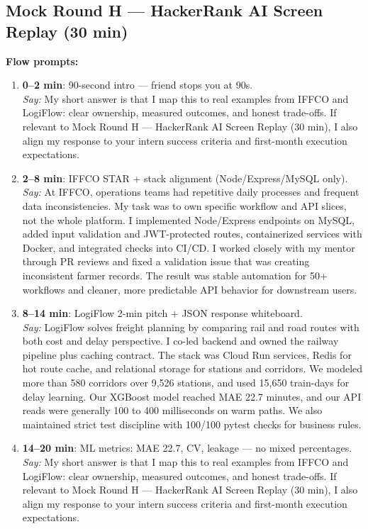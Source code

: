 \documentclass[9pt,a4paper]{article}
\begin{document}
\subsection{Mock Round H --- HackerRank AI Screen Replay (30 min)}
\textbf{Flow prompts:}
\begin{enumerate}
  \item \textbf{0--2 min}: 90-second intro --- friend stops you at 90s.\\
  \textit{Say:} My short answer is that I map this to real examples from IFFCO and LogiFlow: clear ownership, measured outcomes, and honest trade-offs. If relevant to Mock Round H --- HackerRank AI Screen Replay (30 min), I also align my response to your intern success criteria and first-month execution expectations.
  \item \textbf{2--8 min}: IFFCO STAR + stack alignment (Node/Express/MySQL only).\\
  \textit{Say:} At IFFCO, operations teams had repetitive daily processes and frequent data inconsistencies. My task was to own specific workflow and API slices, not the whole platform. I implemented Node/Express endpoints on MySQL, added input validation and JWT-protected routes, containerized services with Docker, and integrated checks into CI/CD. I worked closely with my mentor through PR reviews and fixed a validation issue that was creating inconsistent farmer records. The result was stable automation for 50+ workflows and cleaner, more predictable API behavior for downstream users.
  \item \textbf{8--14 min}: LogiFlow 2-min pitch + JSON response whiteboard.\\
  \textit{Say:} LogiFlow solves freight planning by comparing rail and road routes with both cost and delay perspective. I co-led backend and owned the railway pipeline plus caching contract. The stack was Cloud Run services, Redis for hot route cache, and relational storage for stations and corridors. We modeled more than 580 corridors over 9,526 stations, and used 15,650 train-days for delay learning. Our XGBoost model reached MAE 22.7 minutes, and our API reads were generally 100 to 400 milliseconds on warm paths. We also maintained strict test discipline with 100/100 pytest checks for business rules.
  \item \textbf{14--20 min}: ML metrics: MAE 22.7, CV, leakage --- no mixed percentages.\\
  \textit{Say:} My short answer is that I map this to real examples from IFFCO and LogiFlow: clear ownership, measured outcomes, and honest trade-offs. If relevant to Mock Round H --- HackerRank AI Screen Replay (30 min), I also align my response to your intern success criteria and first-month execution expectations.

\end{enumerate}
\end{document}
